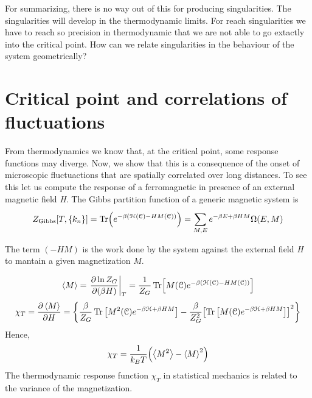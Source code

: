 \documentclass[../main/main.tex]{subfiles}
\begin{document}
For summarizing, there is no way out of this for producing singularities. The singularities will develop in the thermodynamic limits. For reach singularities we have to reach so precision in thermodynamic that we are not able to go extactly into the critical point. How can we relate singularities in the behaviour of the system geometrically?

 \section{Critical point and correlations of fluctuations}
 From thermodynamics we know that, at the critical point, some response functions may diverge. Now, we show that this is a consequence of the onset of microscopic fluctuactions that are spatially correlated over long distances.
 To see this let us compute the response of a ferromagnetic in presence of an external magnetic field \emph{H}.
 The Gibbs partition function of a generic magnetic system is
 \begin{equation}
   Z_{\text{Gibbs}} [T,\{ k_n \}  ] = \Tr(e^{-\beta (\mathcal{H} (\mathcal{C}) - H M (\mathcal{C}))} ) = \sum_{M,E}^{} e^{-\beta E + \beta H M} \Omega (E,M)
 \end{equation}
\begin{remark}
The term \( (- H M) \) is the work done by the system against the external field \emph{H} to mantain a given magnetization \( M \).
\end{remark}
\begin{equation}
  \expval{M} = \eval{ \pdv{\ln{Z_G} }{(\beta H)} }_T = \frac{1}{Z_G} \Tr[M (\mathcal{C}) e^{-\beta ( \mathcal{H} (\mathcal{C}) - H M (\mathcal{C}))} ]
\end{equation}
\begin{equation}
  \chi _T = \pdv{\expval{M} }{H} = \qty{\frac{\beta }{Z_G} \Tr \qty[M^2 (\mathcal{C}) e^{-\beta \mathcal{H} + \beta H M} ] - \frac{\beta }{Z_G^2} \qty[ \Tr \qty[M (\mathcal{C}) e^{-\beta \mathcal{H} + \beta H M } ]  ]^2 }
\end{equation}
Hence,
\begin{equation}
  \chi _T = \frac{1}{k_B T} \qty(\expval{M^2} - \expval{M}^2  )
\end{equation}
The thermodynamic response function \( \chi _T \) in statistical mechanics is related to the variance of the magnetization.
\end{document}
